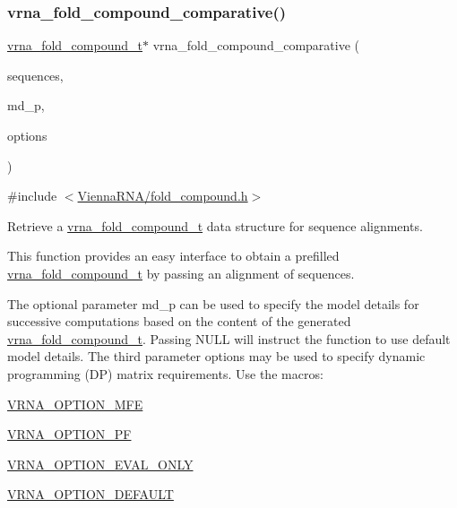 \subsubsection{\texorpdfstring{vrna\+\_\+fold\+\_\+compound\+\_\+comparative()}{vrna\_fold\_compound\_comparative()}}
{\footnotesize\ttfamily \mbox{\hyperlink{group__fold__compound_ga1b0cef17fd40466cef5968eaeeff6166}{vrna\+\_\+fold\+\_\+compound\+\_\+t}}$\ast$ vrna\+\_\+fold\+\_\+compound\+\_\+comparative (\begin{DoxyParamCaption}\item[{const char $\ast$$\ast$}]{sequences,  }\item[{\mbox{\hyperlink{group__model__details_ga1f8a10e12a0a1915f2a4eff0b28ea17c}{vrna\+\_\+md\+\_\+t}} $\ast$}]{md\+\_\+p,  }\item[{unsigned int}]{options }\end{DoxyParamCaption})}



{\ttfamily \#include $<$\mbox{\hyperlink{fold__compound_8h}{Vienna\+R\+N\+A/fold\+\_\+compound.\+h}}$>$}



Retrieve a \mbox{\hyperlink{group__fold__compound_ga1b0cef17fd40466cef5968eaeeff6166}{vrna\+\_\+fold\+\_\+compound\+\_\+t}} data structure for sequence alignments. 

This function provides an easy interface to obtain a prefilled \mbox{\hyperlink{group__fold__compound_ga1b0cef17fd40466cef5968eaeeff6166}{vrna\+\_\+fold\+\_\+compound\+\_\+t}} by passing an alignment of sequences.

The optional parameter {\ttfamily md\+\_\+p} can be used to specify the model details for successive computations based on the content of the generated \mbox{\hyperlink{group__fold__compound_ga1b0cef17fd40466cef5968eaeeff6166}{vrna\+\_\+fold\+\_\+compound\+\_\+t}}. Passing N\+U\+LL will instruct the function to use default model details. The third parameter {\ttfamily options} may be used to specify dynamic programming (DP) matrix requirements. Use the macros\+:


\begin{DoxyItemize}
\item \mbox{\hyperlink{group__fold__compound_gae63be9127fe7dcc1f9bb14f5bb1064ee}{V\+R\+N\+A\+\_\+\+O\+P\+T\+I\+O\+N\+\_\+\+M\+FE}}
\item \mbox{\hyperlink{group__fold__compound_gabfbadcddda3e74ce7f49035ef8f058f7}{V\+R\+N\+A\+\_\+\+O\+P\+T\+I\+O\+N\+\_\+\+PF}}
\item \mbox{\hyperlink{group__fold__compound_ga61469c423131552c8483229f8b6c7e0e}{V\+R\+N\+A\+\_\+\+O\+P\+T\+I\+O\+N\+\_\+\+E\+V\+A\+L\+\_\+\+O\+N\+LY}}
\item \mbox{\hyperlink{group__fold__compound_gacea5b7ee6181c485f36e2afa0e9089e4}{V\+R\+N\+A\+\_\+\+O\+P\+T\+I\+O\+N\+\_\+\+D\+E\+F\+A\+U\+LT}}
\end{DoxyItemize}

